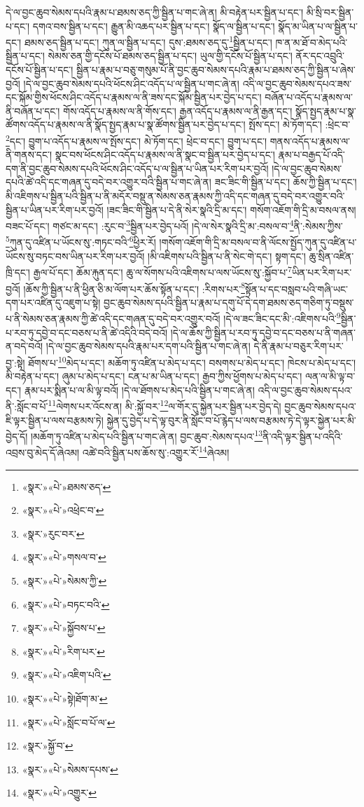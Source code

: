 དེ་ལ་བྱང་ཆུབ་སེམས་དཔའི་རྣམ་པ་ཐམས་ཅད་ཀྱི་སྦྱིན་པ་གང་ཞེ་ན། མི་བརྟེན་པར་སྦྱིན་པ་དང་། མི་སྲི་བར་སྦྱིན་པ་དང་། དགའ་བས་སྦྱིན་པ་དང་། རྒྱུན་མི་འཆད་པར་སྦྱིན་པ་དང་། སྣོད་ལ་སྦྱིན་པ་དང་། སྣོད་མ་ཡིན་པ་ལ་སྦྱིན་པ་དང་། ཐམས་ཅད་སྦྱིན་པ་དང་། ཀུན་ལ་སྦྱིན་པ་དང་། དུས་:ཐམས་ཅད་དུ་\footnote{«སྣར་»«པེ་»ཐམས་ཅད་}སྦྱིན་པ་དང་། ཁ་ན་མ་ཐོ་བ་མེད་པའི་སྦྱིན་པ་དང་། སེམས་ཅན་གྱི་དངོས་པོ་ཐམས་ཅད་སྦྱིན་པ་དང་། ཡུལ་གྱི་དངོས་པོ་སྦྱིན་པ་དང་། ནོར་དང་འབྲུའི་དངོས་པོ་སྦྱིན་པ་དང་། སྦྱིན་པ་རྣམ་པ་བཅུ་གསུམ་པོ་ནི་བྱང་ཆུབ་སེམས་དཔའི་རྣམ་པ་ཐམས་ཅད་ཀྱི་སྦྱིན་པ་ཞེས་བྱའོ། །དེ་ལ་བྱང་ཆུབ་སེམས་དཔའི་ཕོངས་ཤིང་འདོད་པ་ལ་སྦྱིན་པ་གང་ཞེ་ན། འདི་ལ་བྱང་ཆུབ་སེམས་དཔའ་ཟས་དང་སྐོམ་གྱིས་ཕོངས་ཤིང་འདོད་པ་རྣམས་ལ་ནི་ཟས་དང་སྐོམ་སྦྱིན་པར་བྱེད་པ་དང་། བཞོན་པ་འདོད་པ་རྣམས་ལ་ནི་བཞོན་པ་དང་། གོས་འདོད་པ་རྣམས་ལ་ནི་གོས་དང་། རྒྱན་འདོད་པ་རྣམས་ལ་ནི་རྒྱན་དང་། སྣོད་སྤྱད་རྣམ་པ་སྣ་ཚོགས་འདོད་པ་རྣམས་ལ་ནི་སྣོད་སྤྱད་རྣམ་པ་སྣ་ཚོགས་སྦྱིན་པར་བྱེད་པ་དང་། སྤོས་དང་། མེ་ཏོག་དང་། :ཕྲེང་བ་\footnote{«སྣར་»«པེ་»འཕྲེང་བ་}དང་། བྱུག་པ་འདོད་པ་རྣམས་ལ་སྤོས་དང་། མེ་ཏོག་དང་། ཕྲེང་བ་དང་། བྱུག་པ་དང་། གནས་འདོད་པ་རྣམས་ལ་ནི་གནས་དང་། སྣང་བས་ཕོངས་ཤིང་འདོད་པ་རྣམས་ལ་ནི་སྣང་བ་སྦྱིན་པར་བྱེད་པ་དང་། རྣམ་པ་བརྒྱད་པོ་འདི་དག་ནི་བྱང་ཆུབ་སེམས་དཔའི་ཕོངས་ཤིང་འདོད་པ་ལ་སྦྱིན་པ་ཡིན་པར་རིག་པར་བྱའོ། །དེ་ལ་བྱང་ཆུབ་སེམས་དཔའི་ཚེ་འདི་དང་གཞན་དུ་བདེ་བར་འགྱུར་བའི་སྦྱིན་པ་གང་ཞེ་ན། ཟང་ཟིང་གི་སྦྱིན་པ་དང་། ཆོས་ཀྱི་སྦྱིན་པ་དང་། མི་འཇིགས་པ་སྦྱིན་པའི་སྦྱིན་པ་ནི་མདོར་བསྡུ་ན་སེམས་ཅན་རྣམས་ཀྱི་འདི་དང་གཞན་དུ་བདེ་བར་འགྱུར་བའི་སྦྱིན་པ་ཡིན་པར་རིག་པར་བྱའོ། །ཟང་ཟིང་གི་སྦྱིན་པ་དེ་ནི་སེར་སྣའི་དྲི་མ་དང་། གསོག་འཇོག་གི་དྲི་མ་བསལ་ནས། བཟང་པོ་དང་། གཙང་མ་དང་། :རུང་བ་\footnote{«སྣར་»རུང་བར་}སྦྱིན་པར་བྱེད་པའོ། །དེ་ལ་སེར་སྣའི་དྲི་མ་:བསལ་བ་\footnote{«སྣར་»«པེ་»གསལ་བ་}ནི་:སེམས་ཀྱིས་\footnote{«སྣར་»«པེ་»སེམས་ཀྱི་}ཀུན་དུ་འཛིན་པ་ཡོངས་སུ་:གཏང་བའི་\footnote{«སྣར་»«པེ་»བཏང་བའི་}ཕྱིར་རོ། །གསོག་འཇོག་གི་དྲི་མ་བསལ་བ་ནི་ལོངས་སྤྱོད་ཀུན་དུ་འཛིན་པ་ཡོངས་སུ་བཏང་བས་ཡིན་པར་རིག་པར་བྱའོ། །མི་འཇིགས་པའི་སྦྱིན་པ་ནི་སེང་གེ་དང་། སྟག་དང་། ཆུ་སྲིན་འཛིན་ཁྲི་དང་། རྒྱལ་པོ་དང་། ཆོམ་རྐུན་དང་། ཆུ་ལ་སོགས་པའི་འཇིགས་པ་ལས་ཡོངས་སུ་:སྐྱོབ་པ་\footnote{«སྣར་»«པེ་»སྐྱོབས་པ་}ཡིན་པར་རིག་པར་བྱའོ། །ཆོས་ཀྱི་སྦྱིན་པ་ནི་ཕྱིན་ཅི་མ་ལོག་པར་ཆོས་སྟོན་པ་དང་། :རིགས་པར་\footnote{«སྣར་»«པེ་»རིག་པར་}སྟོན་པ་དང་བསླབ་པའི་གཞི་ཡང་དག་པར་འཛིན་དུ་འཇུག་པ་སྟེ། བྱང་ཆུབ་སེམས་དཔའི་སྦྱིན་པ་རྣམ་པ་དགུ་པོ་དེ་དག་ཐམས་ཅད་གཅིག་ཏུ་བསྡུས་པ་ནི་སེམས་ཅན་རྣམས་ཀྱི་ཚེ་འདི་དང་གཞན་དུ་བདེ་བར་འགྱུར་བའོ། །དེ་ལ་ཟང་ཟིང་དང་མི་:འཇིགས་པའི་\footnote{«སྣར་»«པེ་»འཇིག་པའི་}སྦྱིན་པ་རབ་ཏུ་དབྱེ་བ་དང་བཅས་པ་ནི་ཚེ་འདིའི་བདེ་བའོ། །དེ་ལ་ཆོས་ཀྱི་སྦྱིན་པ་རབ་ཏུ་དབྱེ་བ་དང་བཅས་པ་ནི་གཞན་ན་བདེ་བའོ། །དེ་ལ་བྱང་ཆུབ་སེམས་དཔའི་རྣམ་པར་དག་པའི་སྦྱིན་པ་གང་ཞེ་ན། དེ་ནི་རྣམ་པ་བཅུར་རིག་པར་བྱ་:སྟེ། ཐོགས་པ་\footnote{«སྣར་»«པེ་»སྟེ།ཐོག་མ་}མེད་པ་དང་། མཆོག་ཏུ་འཛིན་པ་མེད་པ་དང་། བསགས་པ་མེད་པ་དང་། ཁེངས་པ་མེད་པ་དང་། མི་བརྟེན་པ་དང་། ཞུམ་པ་མེད་པ་དང་། ངན་པ་མ་ཡིན་པ་དང་། རྒྱབ་ཀྱིས་ཕྱོགས་པ་མེད་པ་དང་། ལན་ལ་མི་ལྟ་བ་དང་། རྣམ་པར་སྨིན་པ་ལ་མི་ལྟ་བའོ། །དེ་ལ་ཐོགས་པ་མེད་པའི་སྦྱིན་པ་གང་ཞེ་ན། འདི་ལ་བྱང་ཆུབ་སེམས་དཔའ་ནི་:སློང་བ་པོ་\footnote{«སྣར་»«པེ་»སློང་བ་པོ་ལ་}ལེགས་པར་འོངས་ན། མི་:སྐྱོ་བར་\footnote{«སྣར་»སྐྱོ་བ་}ལ་གོར་དུ་སྐྱེན་པར་སྦྱིན་པར་བྱེད་དེ། བྱང་ཆུབ་སེམས་དཔའ་ཇི་ལྟར་སྦྱིན་པ་ལས་བརྩམས་ཏེ། སྐྱེན་དུ་བྱེད་པ་དེ་ལྟ་བུར་ནི་སློང་བ་པོ་རྙེད་པ་ལས་བརྩམས་ཏེ་དེ་ལྟར་སྐྱེན་པར་མི་བྱེད་དོ། །མཆོག་ཏུ་འཛིན་པ་མེད་པའི་སྦྱིན་པ་གང་ཞེ་ན། བྱང་ཆུབ་:སེམས་དཔའ་\footnote{«སྣར་»«པེ་»སེམས་དཔས་}ནི་འདི་ལྟར་སྦྱིན་པ་འདིའི་འབྲས་བུ་མེད་དོ་ཞེའམ། འཚེ་བའི་སྦྱིན་པས་ཆོས་སུ་:འགྱུར་རོ་\footnote{«སྣར་»«པེ་»འགྱུར་}ཞེའམ། 